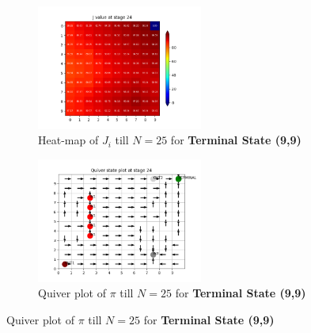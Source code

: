 \begin{figure}[h]
\begin{subfigure}
\centering
\includegraphics[angle=0,width=0.6\textwidth]{hw2/logs/t=99_N=25/J-heatmap-24.png}
\caption{Heat-map of $J_i$ till $N=25$ for \textbf{Terminal State (9,9)}}
\end{subfigure}

\begin{subfigure}
\centering
\includegraphics[angle=0,width=0.6\textwidth]{hw2/logs/t=99_N=25/quiver-24.png}
\caption{Quiver plot of $\pi$ till $N=25$ for \textbf{Terminal State (9,9)}}
\end{subfigure}
\end{figure}
